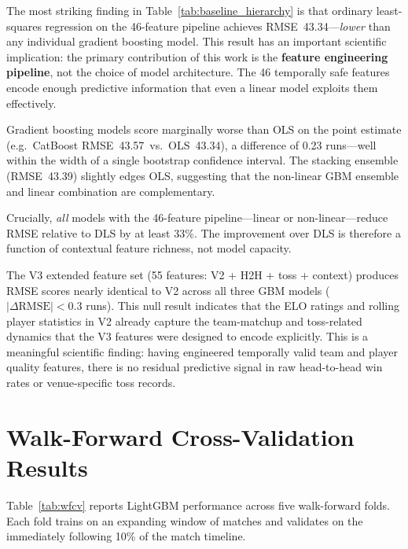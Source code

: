 \documentclass[12pt,a4paper,oneside]{report}
\begin{document}
The most striking finding in Table~\ref{tab:baseline_hierarchy} is that ordinary least-squares regression on the 46-feature pipeline achieves RMSE~43.34---\emph{lower} than any individual gradient boosting model.  This result has an important scientific implication: the primary contribution of this work is the \textbf{feature engineering pipeline}, not the choice of model architecture.  The 46 temporally safe features encode enough predictive information that even a linear model exploits them effectively.

Gradient boosting models score marginally worse than OLS on the point estimate (e.g.\ CatBoost RMSE~43.57~vs.\ OLS~43.34), a difference of 0.23 runs---well within the width of a single bootstrap confidence interval.  The stacking ensemble (RMSE~43.39) slightly edges OLS, suggesting that the non-linear GBM ensemble and linear combination are complementary.

Crucially, \emph{all} models with the 46-feature pipeline---linear or non-linear---reduce RMSE relative to DLS by at least 33\%.  The improvement over DLS is therefore a function of contextual feature richness, not model capacity.

The V3 extended feature set (55 features: V2 + H2H + toss + context) produces RMSE scores nearly identical to V2 across all three GBM models ($|\Delta\text{RMSE}| < 0.3$ runs).  This null result indicates that the ELO ratings and rolling player statistics in V2 already capture the team-matchup and toss-related dynamics that the V3 features were designed to encode explicitly.  This is a meaningful scientific finding: having engineered temporally valid team and player quality features, there is no residual predictive signal in raw head-to-head win rates or venue-specific toss records.

\section{Walk-Forward Cross-Validation Results}
\label{sec:wf_cv_results}

Table~\ref{tab:wfcv} reports LightGBM performance across five walk-forward folds.  Each fold trains on an expanding window of matches and validates on the immediately following 10\% of the match timeline.
\end{document}

